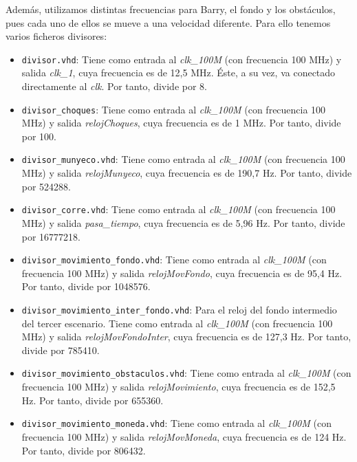 \documentclass[11pt, a4paper, spanish, openright, twoside]{book}
\begin{document}
Además, utilizamos distintas frecuencias para Barry, el fondo y los obstáculos, pues cada uno de ellos se mueve a una velocidad diferente. Para ello tenemos varios ficheros divisores:
\begin{itemize}

	\item \texttt{divisor.vhd}: Tiene como entrada al \emph{clk\_100M} (con frecuencia 100 MHz) y salida \emph{clk\_1}, cuya frecuencia es de 12,5 MHz. Éste, a su vez, va conectado directamente al \emph{clk}. Por tanto, divide por 8. 
	
	\item \texttt{divisor\_choques}: Tiene como entrada al \emph{clk\_100M} (con frecuencia 100 MHz) y salida \emph{relojChoques}, cuya frecuencia es de 1 MHz. Por tanto, divide por 100. 
	
	\item \texttt{divisor\_munyeco.vhd}: Tiene como entrada al \emph{clk\_100M} (con frecuencia 100 MHz) y salida \emph{relojMunyeco}, cuya frecuencia es de 190,7 Hz. Por tanto, divide por 524288.
	
	\item \texttt{divisor\_corre.vhd}: Tiene como entrada al \emph{clk\_100M} (con frecuencia 100 MHz) y salida \emph{pasa\_tiempo}, cuya frecuencia es de 5,96 Hz. Por tanto, divide por 16777218.
	
	\item \texttt{divisor\_movimiento\_fondo.vhd}: Tiene como entrada al \emph{clk\_100M} (con frecuencia 100 MHz) y salida \emph{relojMovFondo}, cuya frecuencia es de 95,4 Hz. Por tanto, divide por 1048576.
	
	\item \texttt{divisor\_movimiento\_inter\_fondo.vhd}: Para el reloj del fondo intermedio del tercer escenario. Tiene como entrada al \emph{clk\_100M} (con frecuencia 100 MHz) y salida \emph{relojMovFondoInter}, cuya frecuencia es de 127,3 Hz. Por tanto, divide por 785410.
	
	\item \texttt{divisor\_movimiento\_obstaculos.vhd}: Tiene como entrada al \emph{clk\_100M} (con frecuencia 100 MHz) y salida \emph{relojMovimiento}, cuya frecuencia es de 152,5 Hz. Por tanto, divide por 655360.
	
	
	\item \texttt{divisor\_movimiento\_moneda.vhd}: Tiene como entrada al \emph{clk\_100M} (con frecuencia 100 MHz) y salida \emph{relojMovMoneda}, cuya frecuencia es de 124 Hz. Por tanto, divide por 806432.
	
\end{itemize}
\end{document}
